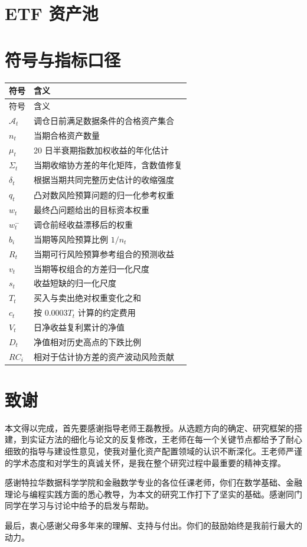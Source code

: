 \documentclass{thesisSWUFE}
\begin{document}
\clearpage
\appendix


\section{ETF 资产池}

\section{符号与指标口径}
\begin{longtable}{p{2.4cm}p{9.2cm}}
\toprule 符号 & 含义\\\midrule
\endfirsthead
\toprule 符号 & 含义\\\midrule\endhead
$\mathcal A_t$ & 调仓日前满足数据条件的合格资产集合\\
$n_t$ & 当期合格资产数量\\
$\mu_t$ & 20 日半衰期指数加权收益的年化估计\\
$\Sigma_t$ & 当期收缩协方差的年化矩阵，含数值修复\\
$\delta_t$ & 根据当期共同完整历史估计的收缩强度\\
$q_t$ & 凸对数风险预算问题的归一化参考权重\\
$w_t$ & 最终凸问题给出的目标资本权重\\
$w_t^-$ & 调仓前经收益漂移后的权重\\
$b_i$ & 当期等风险预算比例 $1/n_t$\\
$R_t$ & 当期可行风险预算参考组合的预测收益\\
$v_t$ & 当期等权组合的方差归一化尺度\\
$s_t$ & 收益短缺的归一化尺度\\
$T_t$ & 买入与卖出绝对权重变化之和\\
$c_t$ & 按 $0.0003T_t$ 计算的约定费用\\
$V_t$ & 日净收益复利累计的净值\\
$D_t$ & 净值相对历史高点的下跌比例\\
$RC_i$ & 相对于估计协方差的资产波动风险贡献\\
\bottomrule
\end{longtable}
\clearpage
\section*{致谢}

本文得以完成，首先要感谢指导老师王磊教授。从选题方向的确定、研究框架的搭建，到实证方法的细化与论文的反复修改，王老师在每一个关键节点都给予了耐心细致的指导与建设性意见，使我对量化资产配置领域的认识不断深化。王老师严谨的学术态度和对学生的真诚关怀，是我在整个研究过程中最重要的精神支撑。

感谢特拉华数据科学学院和金融数学专业的各位任课老师，你们在数学基础、金融理论与编程实践方面的悉心教导，为本文的研究工作打下了坚实的基础。感谢同门同学在学习与讨论中给予的启发与帮助。

最后，衷心感谢父母多年来的理解、支持与付出。你们的鼓励始终是我前行最大的动力。
\end{document}
